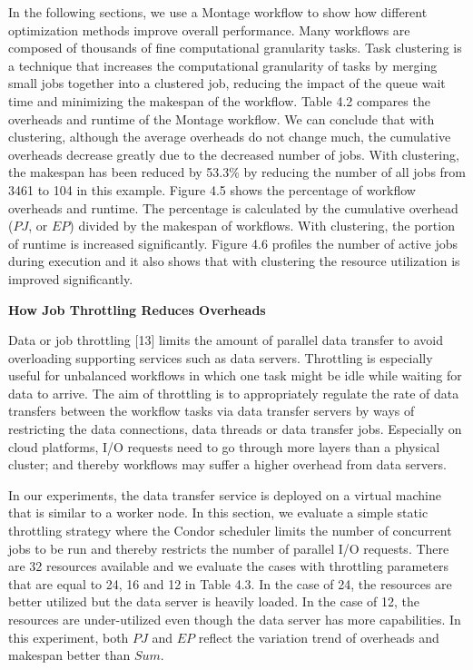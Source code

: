 In the following sections, we use a Montage workflow to show how different optimization methods improve overall performance. Many workflows are composed of thousands of fine computational granularity tasks. Task clustering is a technique that increases the computational granularity of tasks by merging small jobs together into a clustered job, reducing the impact of the queue wait time and minimizing the makespan of the workflow. Table 4.2 compares the overheads and runtime of the Montage workflow. We can conclude that with clustering, although the average overheads do not change much, the cumulative overheads decrease greatly due to the decreased number of jobs. With clustering, the makespan has been reduced by 53.3\% by reducing the number of all jobs from 3461 to 104 in this example. Figure 4.5 shows the percentage of workflow overheads and runtime. The percentage is calculated by the cumulative overhead ($PJ$, or $EP$) divided by the makespan of workflows. With clustering, the portion of runtime is increased significantly. Figure 4.6 profiles the number of active jobs during execution and it also shows that with clustering the resource utilization is improved significantly. 

\textbf{How Job Throttling Reduces Overheads}

Data or job throttling [13] limits the amount of parallel data transfer to avoid overloading supporting services such as data servers. Throttling is especially useful for unbalanced workflows in which one task might be idle while waiting for data to arrive. The aim of throttling is to appropriately regulate the rate of data transfers between the workflow tasks via data transfer servers by ways of restricting the data connections, data threads or data transfer jobs. Especially on cloud platforms, I/O requests need to go through more layers than a physical cluster; and thereby workflows may suffer a higher overhead from data servers.

In our experiments, the data transfer service is deployed on a virtual machine that is similar to a worker node.  In this section, we evaluate a simple static throttling strategy where the Condor scheduler limits the number of concurrent jobs to be run and thereby restricts the number of parallel I/O requests. There are 32 resources available and we evaluate the cases with throttling parameters that are equal to 24, 16 and 12 in Table 4.3. In the case of 24, the resources are better utilized but the data server is heavily loaded. In the case of 12, the resources are under-utilized even though the data server has more capabilities. In this experiment, both $PJ$ and $EP$ reflect the variation trend of overheads and makespan better than $Sum$. 

